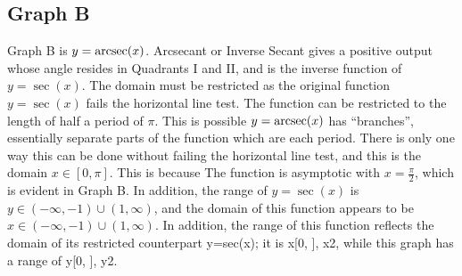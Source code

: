 \subsection{Graph B}

Graph B is $y=\operatorname{arcsec}(x)$.
Arcsecant or Inverse Secant gives a positive output whose angle resides in Quadrants I and II, and is the inverse function of $y=\sec(x)$.
The domain must be restricted as the original function $y=\sec(x)$ fails the horizontal line test.
The function can be restricted to the length of half a period of $\pi$.
This is possible $y=\operatorname{arcsec}(x)$ has “branches”, essentially separate parts of the function which are each period.
There is only one way this can be done without failing the horizontal line test, and this is the domain $x \in{[0,\pi]}$.
This is because The function is asymptotic with $x=\frac{\pi}{2}$, which is evident in Graph B.
In addition, the range of $y=\sec(x)$ is $y \in {{({-\infty}, {-1})} \cup {(1, {\infty})}}$, and the domain of this function appears to be $x \in {{({-\infty}, {-1})} \cup {(1, {\infty})}}$.
In addition, the range of this function reflects the domain of its restricted counterpart y=sec(x); it is x[0, ], x2, while this graph has a range of y[0, ], y2.
